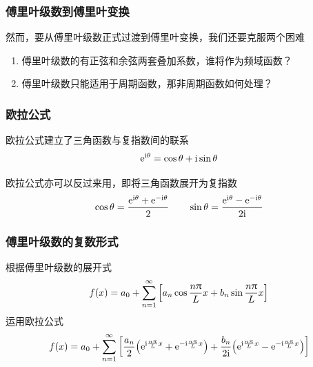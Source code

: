 \begin{frame}
    \frametitle{傅里叶级数到傅里叶变换}
    然而，要从傅里叶级数正式过渡到傅里叶变换，我们还要克服两个困难
    \begin{enumerate}
        \item 傅里叶级数的有正弦和余弦两套叠加系数，谁将作为频域函数？
        \item 傅里叶级数只能适用于周期函数，那非周期函数如何处理？
    \end{enumerate}
\end{frame}

\begin{frame}
    \frametitle{欧拉公式}

    \begin{theorem}[欧拉公式]
        欧拉公式建立了三角函数与复指数间的联系
        \begin{equation}
            \mathrm{e}^{\mathrm{i}\theta}=\cos\theta+\mathrm{i}\sin\theta
        \end{equation}
    \end{theorem}

    欧拉公式亦可以反过来用，即将三角函数展开为复指数
    \begin{equation}
        \cos\theta=\frac{\mathrm{e}^{\mathrm{i}\theta}+\mathrm{e}^{-\mathrm{i}\theta}}{2}\qquad
        \sin\theta=\frac{\mathrm{e}^{\mathrm{i}\theta}-\mathrm{e}^{-\mathrm{i}\theta}}{2\mathrm{i}}
    \end{equation}
\end{frame}

\begin{frame}
    \frametitle{傅里叶级数的复数形式}
    根据傅里叶级数的展开式
    \begin{equation}
        f(x)
        =a_0+\Sum[n=1][\infty]{\qty[a_n\cos\frac{n\pi}{L}x+b_n\sin\frac{n\pi}{L}x]}
    \end{equation}
    运用欧拉公式
    \begin{equation}
        f(x)=a_0+\Sum[n=1][\infty]{\qty[
                    \frac{a_n}{2}\qty(
                    \e^{\i\frac{n\pi}{L}x}+
                    \e^{-\i\frac{n\pi}{L}x})+
                    \frac{b_n}{2\i}\qty(
                    \e^{\i\frac{n\pi}{L}x}-
                    \e^{-\i\frac{n\pi}{L}x})]}
    \end{equation}
\end{frame}


